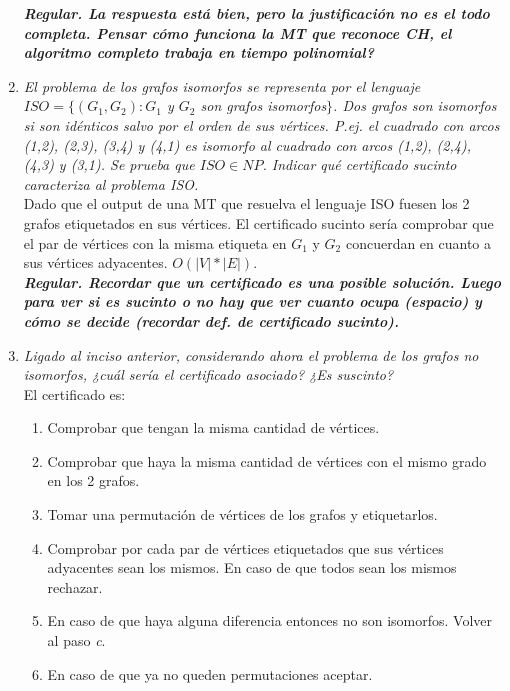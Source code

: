 \documentclass[lnbip]{svmultln}
\begin{document}
\begin{enumerate}
    \textbf{\textit{Regular. La respuesta está bien, pero la justificación no es el todo completa. Pensar cómo funciona la MT que reconoce CH, el algoritmo completo trabaja en tiempo polinomial?}} \\
    
    \item \textit{El problema de los grafos isomorfos se representa por el lenguaje $ISO = \{(G_{1}, G_{2}) : G_{1}$ y $G_{2}$ son grafos isomorfos$\}$. Dos grafos son isomorfos si son idénticos salvo por el orden de sus vértices. P.ej. el cuadrado con arcos (1,2), (2,3), (3,4) y (4,1) es isomorfo al cuadrado con arcos (1,2), (2,4), (4,3) y (3,1). Se prueba que $ISO \in NP$. Indicar qué certificado sucinto caracteriza al problema ISO.} \\
    
    Dado que el output de una MT que resuelva el lenguaje ISO fuesen los 2 grafos etiquetados en sus vértices. El certificado sucinto sería comprobar que el par de vértices con la misma etiqueta en $G_1$ y $G_2$ concuerdan en cuanto a sus vértices adyacentes. $O(|V|*|E|)$. \\
    
    \textbf{\textit{Regular. Recordar que un certificado es una posible solución. Luego para ver si es sucinto o no hay que ver cuanto ocupa (espacio) y cómo se decide (recordar def. de certificado sucinto).}} \\
    
    \item \textit{Ligado al inciso anterior, considerando ahora el problema de los grafos no isomorfos, ¿cuál sería el certificado asociado? ¿Es suscinto?} \\
    
    El certificado es:
    
    \begin{enumerate}
        \item Comprobar que tengan la misma cantidad de vértices.
        \item Comprobar que haya la misma cantidad de vértices con el mismo grado en los 2 grafos. 
        \item Tomar una permutación de vértices de los grafos y etiquetarlos. 
        \item Comprobar por cada par de vértices etiquetados que sus vértices adyacentes sean los mismos. En caso de que todos sean los mismos rechazar.
        \item En caso de que haya alguna diferencia entonces no son isomorfos. Volver al paso \textit{c}.
        \item En caso de que ya no queden permutaciones aceptar. \\
    \end{enumerate}


\end{enumerate}
\end{document}
